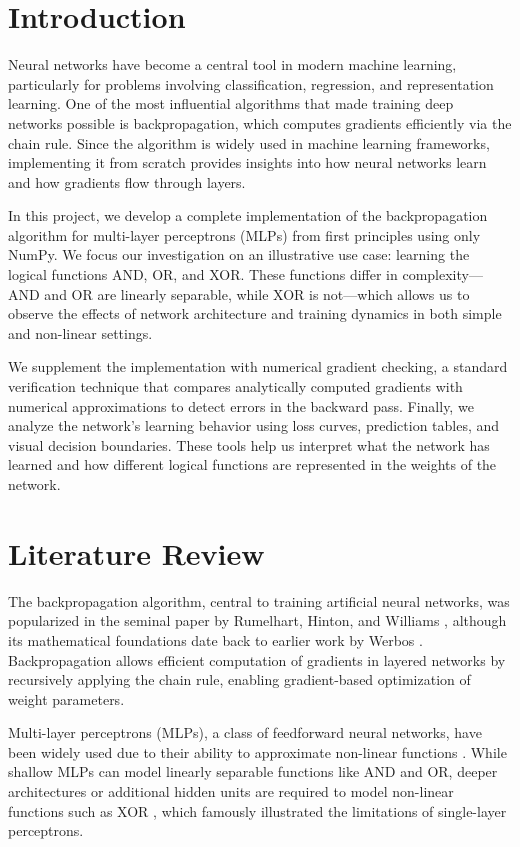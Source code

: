 \documentclass[11pt,a4paper]{article}
\begin{document}
\section{Introduction}
\label{sec:introduction}
Neural networks have become a central tool in modern machine learning, particularly for problems involving classification, regression, and representation learning. One of the most influential algorithms that made training deep networks possible is backpropagation, which computes gradients efficiently via the chain rule. Since the algorithm is widely used in machine learning frameworks, implementing it from scratch provides insights into how neural networks learn and how gradients flow through layers.

In this project, we develop a complete implementation of the backpropagation algorithm for multi-layer perceptrons (MLPs) from first principles using only NumPy. We focus our investigation on an illustrative use case: learning the logical functions AND, OR, and XOR. These functions differ in complexity—AND and OR are linearly separable, while XOR is not—which allows us to observe the effects of network architecture and training dynamics in both simple and non-linear settings.

We supplement the implementation with numerical gradient checking, a standard verification technique that compares analytically computed gradients with numerical approximations to detect errors in the backward pass. Finally, we analyze the network’s learning behavior using loss curves, prediction tables, and visual decision boundaries. These tools help us interpret what the network has learned and how different logical functions are represented in the weights of the network.

\section{Literature Review}
The backpropagation algorithm, central to training artificial neural networks, was popularized in the seminal paper by Rumelhart, Hinton, and Williams \cite{rumelhart1986learning}, although its mathematical foundations date back to earlier work by Werbos \cite{werbos1974beyond}. Backpropagation allows efficient computation of gradients in layered networks by recursively applying the chain rule, enabling gradient-based optimization of weight parameters.

Multi-layer perceptrons (MLPs), a class of feedforward neural networks, have been widely used due to their ability to approximate non-linear functions \cite{HORNIK1989359}. While shallow MLPs can model linearly separable functions like AND and OR, deeper architectures or additional hidden units are required to model non-linear functions such as XOR \cite{minsky1969perceptrons}, which famously illustrated the limitations of single-layer perceptrons.
\end{document}
